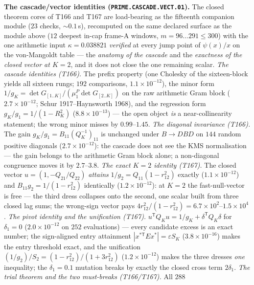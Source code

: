 \par\smallskip\noindent\textbf{The cascade/vector identities
(\texttt{PRIME.CASCADE.VECT.01}).}
The closed theorem cores of T166 and T167 are load-bearing as the
fifteenth companion module ($23$ checks, ${\sim}0.1$\,s), recomputed on
the same declared surface as the module above ($12$ deepest in-cap
frame-A windows, $m=96\ldots291\le300$) with the one arithmetic input
$\kappa=0.038821$ \emph{verified} at every jump point of $\psi(x)/x$ on
the von-Mangoldt table --- the \emph{anatomy of the cascade} and the
\emph{exactness of the closed vector at $K=2$}, and it does not close
the one remaining scalar.
\emph{The cascade identities (T166).} The prefix property (one Cholesky
of the sixteen-block yields all sixteen rungs; $192$ comparisons,
$1.1\times10^{-12}$), the minor form
$1/g_K=\det G_{[1..K]}/(\mu^P_1\det G_{[2..K]})$ on the raw arithmetic
Gram block ($2.7\times10^{-12}$; Schur 1917--Haynsworth 1968), and the
regression form $g_K/g_1=1/(1-R_K^2)$ ($8.8\times10^{-13}$) --- the open
object \emph{is} a near-collinearity statement; the wrong minor misses
by $0.99$--$1.45$.
\emph{The diagonal invariance (T166).} The gain
$g_K/g_1=B_{11}(Q_K^{-1})_{11}$ is unchanged under $B\to DBD$ on $144$
random positive diagonals ($2.7\times10^{-12}$): the cascade does not
see the KMS normalisation --- the gain belongs to the arithmetic Gram
block alone; a non-diagonal congruence moves it by $2.7$--$3.8$.
\emph{The exact $K=2$ identity (T167).} The closed vector
$u=(1,-Q_{21}/Q_{22})$ \emph{attains}
$1/g_2=Q_{11}(1-r_{12}^2)$ exactly ($1.1\times10^{-12}$) and
$B_{11}g_2=1/(1-r_{12}^2)$ identically ($1.2\times10^{-12}$): at $K=2$
the fast-null-vector is free --- the third dress collapses onto the
second, one scalar built from three closed lag sums; the wrong-sign
vector pays $4r_{12}^2/(1-r_{12}^2)=6.7\times10^{2}$--$1.5\times10^{4}$.
\emph{The pivot identity and the unification (T167).}
$u^{\mathsf T}Q_Ku=1/g_K+\delta^{\mathsf T}Q_K\delta$ for $\delta_1=0$
($2.0\times10^{-12}$ on $252$ evaluations) --- every candidate excess is
an exact number; the sign-aligned entry attainment
$|x^{*\mathsf T}Ex^*|=\varepsilon S_K$ ($3.8\times10^{-16}$) makes the
entry threshold exact, and the unification
$(1/g_2)/S_2=(1-r_{12}^2)/(1+3r_{12}^2)$ ($1.2\times10^{-12}$) makes the
three dresses \emph{one} inequality; the $\delta_1=0.1$ mutation breaks
by exactly the closed cross term $2\delta_1$.
\emph{The trial theorem and the two must-breaks (T166/T167).} All $288$
